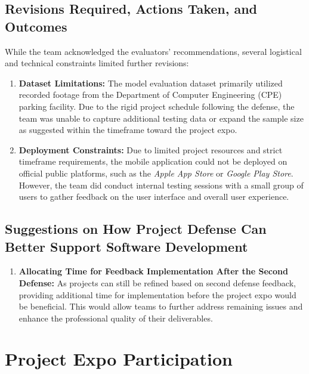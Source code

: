 \subsection{Revisions Required, Actions Taken, and Outcomes}
\label{section:second-project-defense-revisions-required-actions-taken-and-outcomes}

While the team acknowledged the evaluators' recommendations, several logistical and technical constraints limited further revisions:

\begin{enumerate}
    \item \textbf{Dataset Limitations:} The model evaluation dataset primarily utilized recorded footage from the Department of Computer Engineering (CPE) parking facility. Due to the rigid project schedule following the defense, the team was unable to capture additional testing data or expand the sample size as suggested within the timeframe toward the project expo.
    \item \textbf{Deployment Constraints:} Due to limited project resources and strict timeframe requirements, the mobile application could not be deployed on official public platforms, such as the \textit{Apple App Store} or \textit{Google Play Store}. However, the team did conduct internal testing sessions with a small group of users to gather feedback on the user interface and overall user experience.
\end{enumerate}

\subsection{Suggestions on How Project Defense Can Better Support Software Development}
\label{section:second-project-defense-suggestions-on-how-project-defense-can-better-support-software-development}

\begin{enumerate}
    \item \textbf{Allocating Time for Feedback Implementation After the Second Defense:} As projects can still be refined based on second defense feedback, providing additional time for implementation before the project expo would be beneficial. This would allow teams to further address remaining issues and enhance the professional quality of their deliverables.
\end{enumerate}

\section{Project Expo Participation}
\label{section:project-expo-participation}

